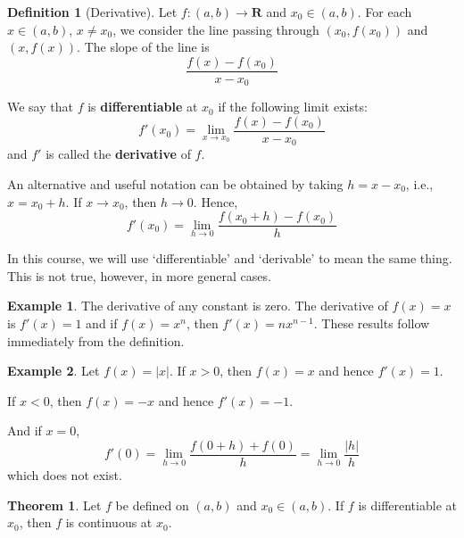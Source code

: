 \documentclass[tikz,12pt,a4paper]{article}
\theoremstyle{definition}
\newtheorem{theorem}{Theorem}[section]
\newtheorem{example}{Example}[section]
\newtheorem{definition}{Definition}[section]
\begin{document}
\begin{definition}[Derivative]
	Let $f : (a,b) \longrightarrow \textbf{R}$ and $x_0 \in (a,b)$. For each $x \in (a,b)$, $x \neq x_0$, we consider the line passing through $(x_0, f(x_0))$ and $(x, f(x))$. The slope of the line is
	\[
		\frac{f(x) - f(x_0)}{x - x_0}
	\]

	We say that $f$ is \textbf{differentiable} at $x_0$ if the following limit exists:
	\[
		f'(x_0)	 = \lim_{x \to x_0} \frac{f(x) - f(x_0)}{x - x_0}
	\]
	and $f'$ is called the \textbf{derivative} of $f$.
\end{definition}

An alternative and useful notation can be obtained by taking $h = x - x_0$, i.e., $x = x_0 + h$. If $x \to x_0$, then $h \to 0$. Hence,
\[
	f'(x_0) = \lim_{h \to 0} \frac{f(x_0 + h) - f(x_0)}{h}
\]

In this course, we will use `differentiable' and `derivable' to mean the same thing. This is not true, however, in more general cases.

\begin{example}
	The derivative of any constant is zero. The derivative of $f(x) = x$ is $f'(x) = 1$ and if $f(x) = x^n$, then $f'(x) = n x^{n-1}$. These results follow immediately from the definition.
\end{example}

\begin{example}
	Let $f(x) = |x|$. If $x > 0$, then $f(x) = x$ and hence $f'(x) = 1$.

	If $x<0$, then $f(x) = -x$ and hence $f'(x) = -1$.

	And if $x=0$,
	\[
		f'(0) = \lim_{h \to 0} \frac{f(0+h) + f(0)}{h} = \lim_{h \to 0} \frac{|h|}{h}
	\]
	which does not exist.
\end{example}

\begin{theorem}
	Let $f$ be defined on $(a,b)$ and $x_0 \in (a,b)$. If $f$ is differentiable at $x_0$, then $f$ is continuous at $x_0$.
\end{theorem}
\end{document}
